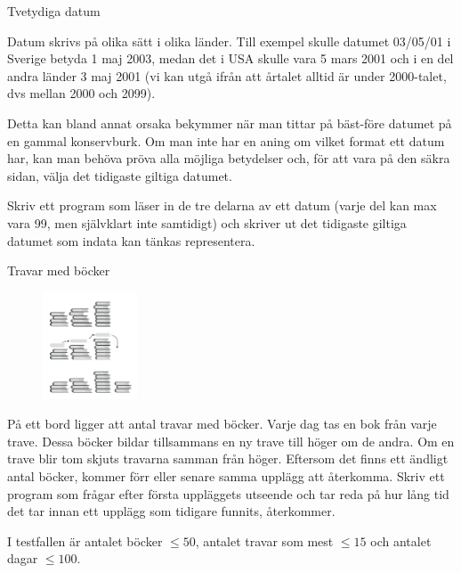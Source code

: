 \documentclass[10pt]{beamer}
\begin{document}
\begin{frame}{Tvetydiga datum}

Datum skrivs på olika sätt i olika länder. Till exempel skulle datumet 03/05/01 i Sverige betyda 1 maj 2003, medan det i USA skulle vara 5 mars 2001 och i en del andra länder 3 maj 2001 (vi kan utgå ifrån att årtalet alltid är under 2000-talet, dvs mellan 2000 och 2099).

Detta kan bland annat orsaka bekymmer när man tittar på bäst-före datumet på en gammal konservburk. Om man inte har en aning om vilket format ett datum har, kan man behöva pröva alla möjliga betydelser och, för att vara på den säkra sidan, välja det tidigaste giltiga datumet.

Skriv ett program som läser in de tre delarna av ett datum (varje del kan max vara 99, men självklart inte samtidigt) och skriver ut det tidigaste giltiga datumet som indata kan tänkas representera.

\end{frame}





\begin{frame}{Travar med böcker}


\begin{figure}[!ht]
\centering
\includegraphics[width=0.25\textwidth]{Travar}
\label{fig:bocker}
\end{figure}

På ett bord ligger att antal travar med böcker. Varje dag tas en bok från varje trave. Dessa böcker bildar tillsammans en ny trave till höger om de andra. Om en trave blir tom skjuts travarna samman från höger. Eftersom det finns ett ändligt antal böcker, kommer förr eller senare samma upplägg att återkomma. Skriv ett program som frågar efter första uppläggets utseende och tar reda på hur lång tid det tar innan ett upplägg som tidigare funnits, återkommer.

I testfallen är antalet böcker $\le50$, antalet travar som mest $\le15$ och antalet dagar $\le100$.
\end{frame}
\end{document}
